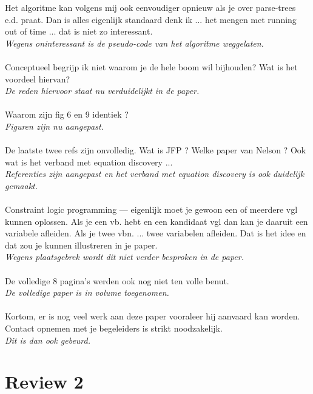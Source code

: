 \documentclass{article}
\begin{document}
Het algoritme kan volgens mij ook eenvoudiger opnieuw als je over parse-trees e.d. praat. Dan is alles eigenlijk standaard denk ik ... het mengen met running out of time ... dat is niet zo interessant. \\
\textit{Wegens oninteressant is de pseudo-code van het algoritme weggelaten.} \\ \\

Conceptueel begrijp ik niet waarom je de hele boom wil bijhouden? Wat is het voordeel hiervan? \\ 
\textit{De reden hiervoor staat nu verduidelijkt in de paper.} \\ \\

Waarom zijn fig 6 en 9 identiek ? \\
\textit{Figuren zijn nu aangepast.} \\ \\
De laatste twee refs zijn onvolledig. Wat is JFP ? Welke paper van Nelson ? Ook wat is het verband met equation discovery ... \\
\textit{Referenties zijn aangepast en het verband met equation discovery is ook duidelijk gemaakt.} \\ \\

Constraint logic programming — eigenlijk moet je gewoon een of meerdere vgl kunnen oplossen.
Als je een vb. hebt en een kandidaat vgl dan kan je daaruit een variabele afleiden.
Als je twee vbn. ... twee variabelen afleiden. Dat is het idee en dat zou je kunnen illustreren in je paper. \\
\textit{Wegens plaatsgebrek wordt dit niet verder besproken in de paper.} \\ \\

De volledige 8 pagina’s werden ook nog niet ten volle benut. \\
\textit{De volledige paper is in volume toegenomen.} \\ \\

Kortom, er is nog veel werk aan deze paper vooraleer hij aanvaard kan worden. Contact opnemen met je begeleiders is strikt noodzakelijk.\\
\textit{Dit is dan ook gebeurd.}

\section{Review 2}
\end{document}
